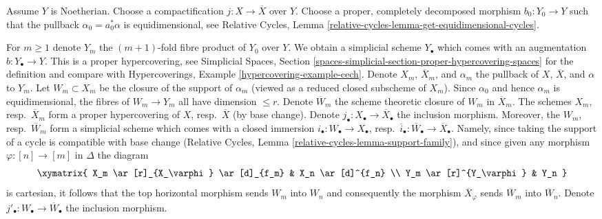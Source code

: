 \medskip\noindent
Assume $Y$ is Noetherian.
Choose a compactification $j : X \to \overline{X}$ over $Y$.
Choose a proper, completely decomposed morphism
$b_0 : Y_0 \to Y$ such that the pullback $\alpha_0 = a_0^*\alpha$
is equidimensional, see
Relative Cycles, Lemma \ref{relative-cycles-lemma-get-equidimensional-cycles}.

\medskip\noindent
For $m \geq 1$ denote $Y_m$ the $(m + 1)$-fold fibre product of $Y_0$ over $Y$.
We obtain a simplicial scheme $Y_\bullet$ which comes with an augmentation
$b : Y_\bullet \to Y$. This is a proper hypercovering, see
Simplicial Spaces, Section
\ref{spaces-simplicial-section-proper-hypercovering-spaces}
for the definition and compare with
Hypercoverings, Example \ref{hypercovering-example-cech}.
Denote $X_m$, $\overline{X}_m$, and $\alpha_m$ the pullback of
$X$, $\overline{X}$, and $\alpha$ to $Y_m$. Let $W_m \subset X_m$
be the closure of the support of $\alpha_m$ (viewed as a reduced
closed subscheme of $X_m$). Since $\alpha_0$ and hence $\alpha_m$
is equidimensional, the fibres of $W_m \to Y_m$ all have dimension $\leq r$.
Denote $\overline{W}_m$ the scheme theoretic closure of $W_m$ in
$\overline{X}_m$. The schemes $X_m$, resp.\ $\overline{X}_m$
form a proper hypercovering of $X$, resp.\ $\overline{X}$ (by base change).
Denote $j_\bullet : X_\bullet \to \overline{X}_\bullet$ the inclusion
morphism. Moreover, the $W_m$, resp.\ $\overline{W}_m$ form a simplicial
scheme which comes with a closed immersion
$i_\bullet : W_\bullet \to X_\bullet$,
resp.\ $\overline{i}_\bullet : \overline{W}_\bullet \to \overline{X}_\bullet$.
Namely, since taking the support of a cycle is compatible with base
change (Relative Cycles, Lemma \ref{relative-cycles-lemma-support-family}),
and since given any morphism $\varphi : [n] \to [m]$ in $\Delta$ the diagram
$$
\xymatrix{
X_m \ar[r]_{X_\varphi} \ar[d]_{f_m} & X_n \ar[d]^{f_n} \\
Y_m \ar[r]^{Y_\varphi} & Y_n
}
$$
is cartesian, it follows that the top horizontal morphism sends
$W_m$ into $W_n$ and consequently the morphism $\overline{X}_\varphi$ sends
$\overline{W}_m$ into $\overline{W}_n$. Denote
$j'_\bullet : W_\bullet \to \overline{W}_\bullet$ the inclusion morphism.

